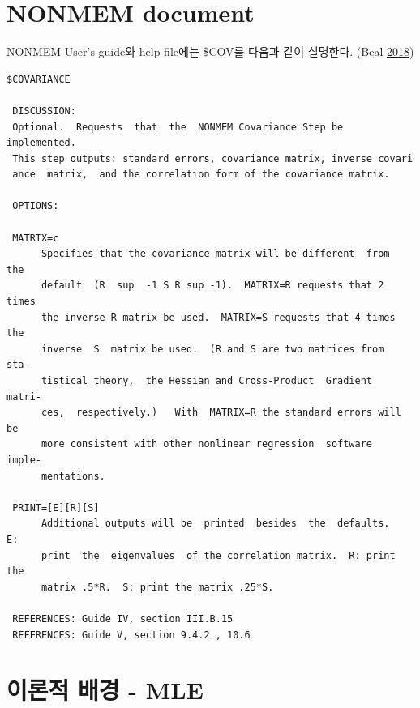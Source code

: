\documentclass[
  11pt,
  krantz2, a4paper, twoside]{krantz}
\theoremstyle{definition}
\theoremstyle{definition}
\theoremstyle{definition}
\theoremstyle{remark}
\begin{document}
\hypertarget{nonmem-document}{%
\section{NONMEM document}\label{nonmem-document}}

NONMEM User's guide와 help file에는 \$COV를 다음과 같이 설명한다. (Beal \protect\hyperlink{ref-nonmem}{2018})

\begin{verbatim}
$COVARIANCE

 DISCUSSION:
 Optional.  Requests  that  the  NONMEM Covariance Step be implemented.
 This step outputs: standard errors, covariance matrix, inverse covari
 ance  matrix,  and the correlation form of the covariance matrix.

 OPTIONS:

 MATRIX=c
      Specifies that the covariance matrix will be different  from  the
      default  (R  sup  -1 S R sup -1).  MATRIX=R requests that 2 times
      the inverse R matrix be used.  MATRIX=S requests that 4 times the
      inverse  S  matrix be used.  (R and S are two matrices from  sta-
      tistical theory,  the Hessian and Cross-Product  Gradient  matri-
      ces,  respectively.)   With  MATRIX=R the standard errors will be
      more consistent with other nonlinear regression  software  imple-
      mentations.

 PRINT=[E][R][S]
      Additional outputs will be  printed  besides  the  defaults.   E:
      print  the  eigenvalues  of the correlation matrix.  R: print the
      matrix .5*R.  S: print the matrix .25*S.

 REFERENCES: Guide IV, section III.B.15
 REFERENCES: Guide V, section 9.4.2 , 10.6
\end{verbatim}


\hypertarget{uxc774uxb860uxc801-uxbc30uxacbd---mle}{%
\section{이론적 배경 - MLE}\label{uxc774uxb860uxc801-uxbc30uxacbd---mle}}
\end{document}
